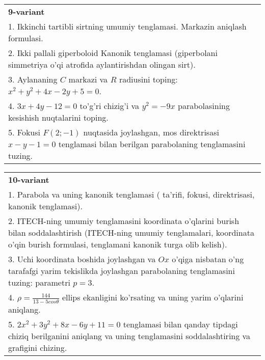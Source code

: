 \documentclass{article}
\begin{document}
\begin{tabular}{m{17cm}}
\textbf{9-variant}\\
1. Ikkinchi tartibli sirtning umumiy tenglamasi. Markazin aniqlash formulasi.\\

2. Ikki pallali giperboloid Kanonik tenglamasi (giperbolani simmetriya o'qi atrofida aylantirishdan olingan sirt).\\

3. Aylananing $C$ markazi va $R$ radiusini toping: $x^2+y^2+4x-2y+5=0$.\\

4. $3x + 4y - 12 = 0$ to'g'ri chizig'i va $y^{2} = - 9x$ parabolasining kesishish nuqtalarini toping.\\

5. Fokusi $F(2; - 1)$ nuqtasida joylashgan, mos direktrisasi $x - y - 1 = 0$ tenglamasi bilan berilgan parabolaning tenglamasini tuzing.  
\end{tabular}
\vspace{1cm}


\begin{tabular}{m{17cm}}
\textbf{10-variant}\\
1. Parabola va uning kanonik tenglamasi ( ta'rifi, fokusi, direktrisasi, kanonik tenglamasi).\\

2. ITECH-ning umumiy tenglamasini koordinata o'qlarini burish bilan soddalashtirish (ITECH-ning umumiy tenglamalari, koordinata o'qin burish formulasi, tenglamani kanonik turga olib kelish).\\

3. Uchi koordinata boshida joylashgan va $Ox$ o'qiga nisbatan o'ng tarafafgi yarim tekislikda joylashgan parabolaning tenglamasini tuzing: parametri $p=3$.\\

4. $\rho = \frac{144}{13 - 5cos\theta}$ ellips ekanligini ko'rsating va uning yarim o'qlarini aniqlang.\\

5. $2x^{2} + 3y^{2} + 8x - 6y + 11 = 0$ tenglamasi bilan qanday tipdagi chiziq berilganini aniqlang va uning tenglamasini soddalashtiring va grafigini chizing.  
\end{tabular}
\vspace{1cm}
\end{document}
